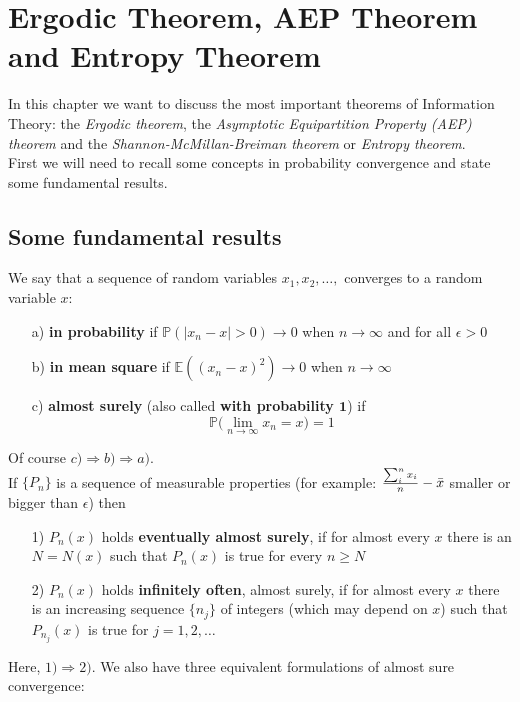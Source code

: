 \chapter{Ergodic Theorem, AEP Theorem and Entropy Theorem}
In this chapter we want to discuss the most important theorems of Information Theory: the \textit{Ergodic theorem}, the \textit{Asymptotic Equipartition Property (AEP) theorem} and the \textit{Shannon-McMillan-Breiman theorem} or \textit{Entropy theorem}.
\\First we will need to recall some concepts in probability convergence and state some fundamental results.

\section{Some fundamental results}
We say that a sequence of random variables $x_1, x_2, \dots, $ converges to a random variable $x$:
\begin{itemize}
    \item[a)] \textbf{in probability} if $\mathbb{P}(|x_n - x| > 0) \rightarrow 0$ when $n \rightarrow \infty$ and for all $\epsilon >0$
    \item[b)] \textbf{in mean square} if $\mathbb{E}( (x_n - x)^2 ) \rightarrow 0$ when $n \rightarrow \infty$
    \item[c)] \textbf{almost surely} (also called \textbf{with probability $\bm{1}$}) if 
    \begin{equation}
        \mathbb{P} \big( \lim_{n \rightarrow \infty} x_n = x \big) = 1
    \end{equation}
\end{itemize}
Of course $c) \Rightarrow b) \Rightarrow a)$. \\
If $\{P_n\}$ is a sequence of measurable properties (for example: $\frac{\sum_i^n x_i}{n} - \Bar{x}$ smaller or bigger than $\epsilon$) then
\begin{itemize}
    \item[1)] $P_n(x)$ holds \textbf{eventually almost surely}, if for almost every $x$ there is an $N=N(x)$ such that $P_n(x)$ is true for every $n \geq N$
    \item[2)] $P_n(x)$ holds \textbf{infinitely often}, almost surely, if for almost every $x$ there is an increasing sequence $\{n_j \}$ of integers (which may depend on $x$) such that $P_{n_j}(x)$ is true for $j = 1,2, \dots$
\end{itemize}
Here, $1) \Rightarrow 2)$. We also have three equivalent formulations of almost sure convergence:
